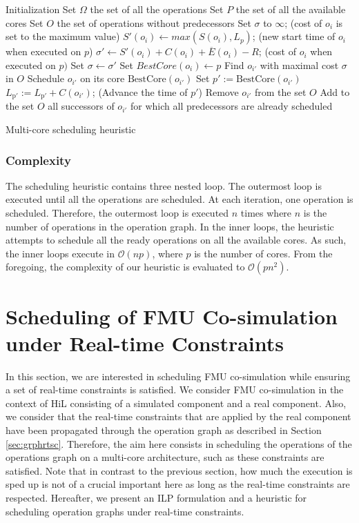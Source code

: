 \begin{algorithm}[!htp]		
	  Initialization\;
		Set $\Omega$ the set of all the operations\;  
		Set $P$ the set of all the available cores\; 
 		Set $O$ the set of operations without predecessors\;  		
		{
			{
 				Set $\sigma$ to $\infty$; (cost of $o_i$ is set to the maximum value)\;
				{
  				$S'(o_i) \leftarrow max(S(o_i) , L_p)$; (new start time of $o_i$ when executed on $p$)\;
  				$\sigma' \leftarrow S'(o_i) + C(o_i) + \overline{E}(o_i) - R$; (cost of $o_i$ when executed on $p)$\;
					{
  					Set $\sigma \leftarrow \sigma'$\;
  					Set $BestCore(o_i) \leftarrow p$\;
  				}
  			}
  		 }
  		 Find $o_{i'}$ with maximal cost $\sigma$ in $O$\; 
  		 Schedule $o_{i'}$ on its core $\mathrm{BestCore}(o_{i'})$\;
  		 Set $p' := \mathrm{BestCore}(o_{i'})$\;
  		 $L_{\mathrm{p'}} := L_{\mathrm{p'}} + C(o_{i'})$; (Advance the time of $p'$)\;
  		 Remove $o_{i'}$ from the set $O$\;
  		 Add to the set $O$ all successors of $o_{i'}$ for which all predecessors are already scheduled\;
		}
	\caption{Multi-core scheduling heuristic}
	\label{algo:sched}
\end{algorithm}

\subsubsection{Complexity}

The scheduling heuristic contains three nested loop. The outermost loop is executed until all the operations are scheduled. At each iteration, one operation is scheduled. Therefore, the outermost loop is executed $n$ times where $n$ is the number of operations in the operation graph. In the inner loops, the heuristic attempts to schedule all the ready operations on all the available cores. As such, the inner loops execute in $\mathcal{O}(np)$, where $p$ is the number of cores. From the foregoing, the complexity of our heuristic is evaluated to $\mathcal{O}(pn^2)$.

\section{Scheduling of FMU Co-simulation under Real-time Constraints}

In this section, we are interested in scheduling FMU co-simulation while ensuring a set of real-time constraints  is satisfied. We consider FMU co-simulation in the context of HiL consisting of a simulated component and a real component. Also, we consider that the real-time constraints that are applied by the real component have been propagated through the operation graph as described in Section \ref{sec:grphrtsc}. Therefore, the aim here consists in scheduling the operations of the operations graph on a multi-core architecture, such as these constraints are satisfied. Note that in contrast to the previous section, how much the execution is sped up is not of a crucial important here as long as the real-time constraints are respected. Hereafter, we present an ILP formulation and a heuristic for scheduling operation graphs under real-time constraints.


